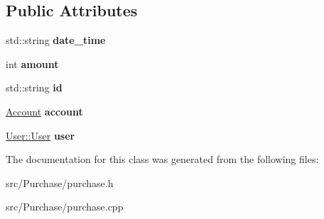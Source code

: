 \subsection*{Public Attributes}
\begin{DoxyCompactItemize}
\item 
\hypertarget{classPurchase_acdb5fa722a3b86e08434bc08080299c4}{std\-::string {\bfseries date\-\_\-time}}\label{classPurchase_acdb5fa722a3b86e08434bc08080299c4}

\item 
\hypertarget{classPurchase_a8dc83cf3df8816ec75a71be285578c7e}{int {\bfseries amount}}\label{classPurchase_a8dc83cf3df8816ec75a71be285578c7e}

\item 
\hypertarget{classPurchase_aed492c0134dd3e746f4082f165bf1378}{std\-::string {\bfseries id}}\label{classPurchase_aed492c0134dd3e746f4082f165bf1378}

\item 
\hypertarget{classPurchase_a4572c7c8a290c4a916605349c4a53974}{\hyperlink{classAccount}{Account} {\bfseries account}}\label{classPurchase_a4572c7c8a290c4a916605349c4a53974}

\item 
\hypertarget{classPurchase_ae50d1aef59bd68dbc62a14d0fa72ff58}{\hyperlink{classUser_1_1User}{User\-::\-User} {\bfseries user}}\label{classPurchase_ae50d1aef59bd68dbc62a14d0fa72ff58}

\end{DoxyCompactItemize}


The documentation for this class was generated from the following files\-:\begin{DoxyCompactItemize}
\item 
src/\-Purchase/purchase.\-h\item 
src/\-Purchase/purchase.\-cpp\end{DoxyCompactItemize}
